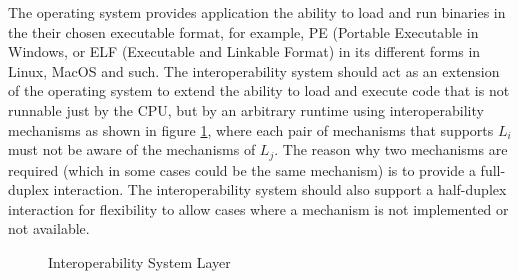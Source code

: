 \documentclass[sigplan,10pt,manuscript,nonacm]{acmart}
\begin{document}
The operating system provides application the ability to load and run binaries in the their chosen executable format, for example, PE (Portable Executable \cite{portable_executable} in Windows, or ELF (Executable and Linkable Format) in its different forms in Linux, MacOS and such. The interoperability system should act as an extension of the operating system to extend the ability to load and execute code that is not runnable just by the CPU, but by an arbitrary runtime using interoperability mechanisms as shown in figure \ref{fig:interoperability_system_layer}, where each pair of mechanisms that supports $L_i$ must not be aware of the mechanisms of $L_j$. The reason why two mechanisms are required (which in some cases could be the same mechanism) is to provide a full-duplex interaction. The interoperability system should also support a half-duplex interaction for flexibility to allow cases where a mechanism is not implemented or not available.

\begin{figure}[h]
\centering
{}
\caption{Interoperability System Layer}
\label{fig:interoperability_system_layer}
\end{figure}
\end{document}
